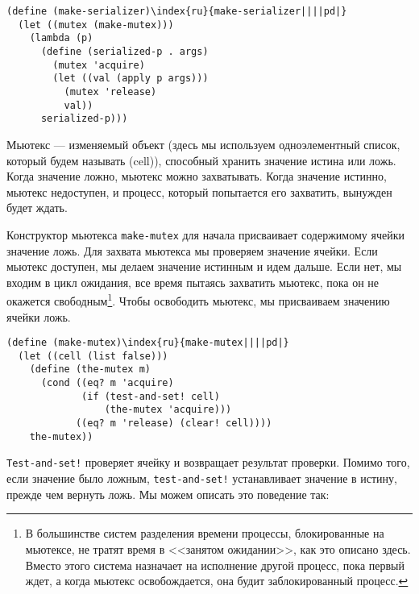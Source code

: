 \begin{Verbatim}[fontsize=\small]
(define (make-serializer)\index{ru}{make-serializer||||pd|}
  (let ((mutex (make-mutex)))
    (lambda (p)
      (define (serialized-p . args)
        (mutex 'acquire)
        (let ((val (apply p args)))
          (mutex 'release)
          val))
      serialized-p)))
\end{Verbatim}


Мьютекс --- изменяемый объект (здесь мы используем
одноэлементный список, который будем называть
 (cell)),
способный хранить значение истина или ложь.  Когда значение ложно,
мьютекс можно захватывать.  Когда значение истинно, мьютекс недоступен,
и процесс, который попытается его захватить, вынужден будет ждать.

Конструктор мьютекса {\tt make-mutex} для начала
присваивает содержимому ячейки значение ложь.  Для захвата мьютекса мы проверяем
значение ячейки.  Если мьютекс доступен, мы делаем значение истинным и
идем дальше.  Если нет, мы входим в цикл ожидания, все время пытаясь
захватить мьютекс, пока он не окажется свободным\footnote{В большинстве систем разделения времени процессы,
  блокированные на мьютексе, не тратят время в
  <<занятом ожидании>>, как
  это описано здесь.  Вместо этого система назначает на исполнение другой
  процесс, пока первый ждет, а когда мьютекс освобождается, она будит
  заблокированный процесс.}.
Чтобы освободить мьютекс, мы присваиваем значению ячейки ложь.

\begin{Verbatim}[fontsize=\small]
(define (make-mutex)\index{ru}{make-mutex||||pd|}
  (let ((cell (list false)))
    (define (the-mutex m)
      (cond ((eq? m 'acquire)
             (if (test-and-set! cell)
                 (the-mutex 'acquire)))
            ((eq? m 'release) (clear! cell))))
    the-mutex))
\end{Verbatim}


{\tt Test-and-set!} проверяет ячейку и возвращает
результат проверки.  Помимо того, если значение было ложным,
{\tt test-and-set!} устанавливает значение в истину, прежде чем
вернуть ложь.  Мы можем описать это поведение так:

